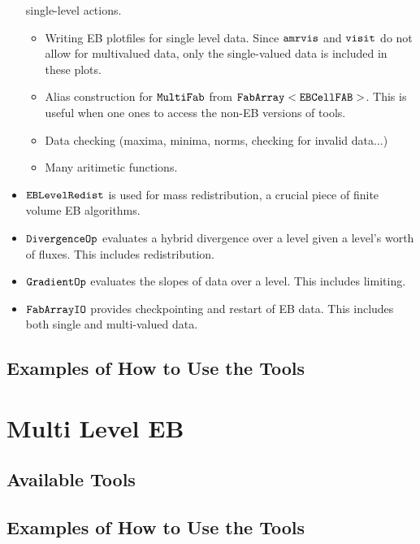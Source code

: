 \begin{itemize}
  single-level actions.
\begin{itemize}
  \item Writing EB plotfiles for single level data.   Since
    $\tt{amrvis}$ and $\tt{visit}$ do not allow for multivalued data,
    only the single-valued data is included in these plots.
  \item Alias construction for $\tt{MultiFab}$ from
    $\tt{FabArray<EBCellFAB>}$.  This is useful when one ones to
    access the non-EB versions of tools.
  \item Data checking (maxima, minima, norms, checking for invalid
    data...)
  \item Many aritimetic functions.
\end{itemize}
 \item $\tt{EBLevelRedist}$  is used for mass redistribution, a
   crucial piece of finite volume EB algorithms.
 \item $\tt{DivergenceOp}$  evaluates a hybrid divergence over a level
   given a level's worth of fluxes.  This includes redistribution.
 \item $\tt{GradientOp}$  evaluates the slopes of data over a level.  
   This includes limiting.
 \item $\tt{FabArrayIO}$  provides checkpointing and restart of EB
   data.  This includes both single and multi-valued data.
\end{itemize}

\subsection{Examples of How to Use the Tools}

\section{Multi Level EB}
\label{sec:EB:EBAMRTools}

\subsection{Available Tools}

\subsection{Examples of How to Use the Tools}

